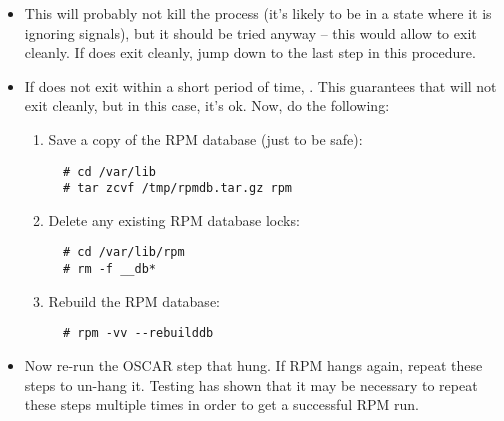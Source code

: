\begin{itemize}
\begin{itemize}
        \item This will probably not kill the process (it's likely to
          be in a state where it is ignoring signals), but it should
          be tried anyway -- this would allow  to exit
          cleanly.  If  does exit cleanly, jump down to the
          last step in this procedure.
          
        \item If  does not exit within a short period of
          time, .  This guarantees that
           will not exit cleanly, but in this case, it's ok.
          Now, do the following:
                        \begin{enumerate}
                        \item Save a copy of the RPM database (just to
                          be safe):
\begin{verbatim}
  # cd /var/lib
  # tar zcvf /tmp/rpmdb.tar.gz rpm
\end{verbatim}
                          
                        \item Delete any existing RPM database locks:
\begin{verbatim}
  # cd /var/lib/rpm
  # rm -f __db*
\end{verbatim}
                          
                        \item Rebuild the RPM database:
\begin{verbatim}
  # rpm -vv --rebuilddb
\end{verbatim}
                        \end{enumerate}
                        
                      \item Now re-run the OSCAR step that hung.  If
                        RPM hangs again, repeat these steps to un-hang
                        it.  Testing has shown that it may be
                        necessary to repeat these steps multiple times
                        in order to get a successful RPM run.
        \end{itemize}

\end{itemize}



